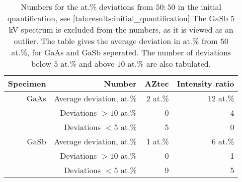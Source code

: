 \begin{table}[phtb]
    \begin{center}
        \caption{
            Numbers for the at.\% deviations from $50:50$ in the initial quantification, see \cref{tab:results:initial_quantification}
            The GaSb $5$ kV spectrum is excluded from the numbers, as it is viewed as an outlier.
            The table gives the average deviation in at.\% from $50$ at.\%, for GaAs and GaSb seperated.
            The number of deviations below $5$ at.\% and above $10$ at.\% are also tabulated.
        }
        \label{tab:results:initial_quantification_stats}
        \begin{tabular}{rrrr}
            \hline
            \textbf{Specimen} & \textbf{Number}         & \textbf{AZtec} & \textbf{Intensity ratio} \\
            \hline
            GaAs              & Average deviation, at.\% & 2 at.\%         & 12 at.\%                  \\
                              & Deviations $>10$ at.\%   & 0              & 4                        \\
                              & Deviations  $<5$  at.\%  & 5              & 0                        \\
            \hline
            GaSb              & Average deviation, at.\% & 1 at.\%         & 6 at.\%                   \\
                              & Deviations $>10$ at.\%   & 0              & 1                        \\
                              & Deviations  $<5$  at.\%  & 9              & 5                        \\

            \hline
        \end{tabular}
    \end{center}
\end{table}
